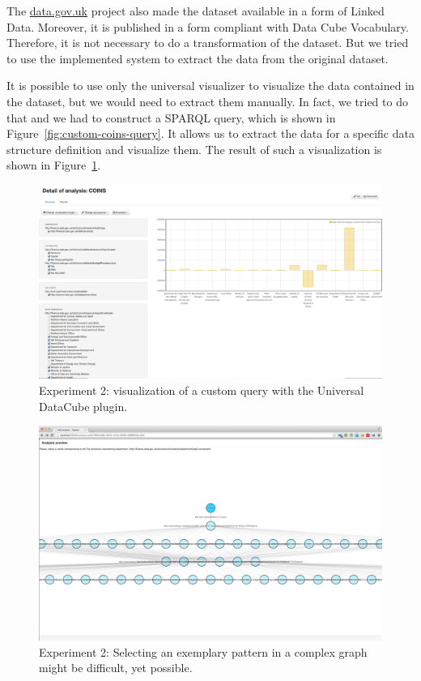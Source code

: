 The \url{data.gov.uk} project also made the dataset available in a form of Linked 
Data. Moreover, it is published in a form compliant with Data Cube Vocabulary.
Therefore, it is not necessary to do a transformation of the dataset. But we 
tried to use the implemented system to extract the data from the original 
dataset.

It is possible to use only the universal visualizer to visualize the data 
contained in the dataset, but we would need to extract them manually. In fact, 
we tried to do that and we had to construct a SPARQL query, which is shown in
Figure~\ref{fig:custom-coins-query}. It allows us to extract the data for a specific data structure 
definition and visualize them. The result of such a visualization is shown in 
Figure~\ref{fig:payola-exp-02}. 

\begin{figure}
  \centering
  \includegraphics[width=140mm]{img/payola-exp-02.png}
  \caption{Experiment 2: visualization of a custom query with the Universal DataCube plugin.}
  \label{fig:payola-exp-02}
\end{figure}

\begin{figure}
  \centering
  \includegraphics[width=140mm]{img/payola-exp-02-pattern.png}
  \caption{Experiment 2: Selecting an exemplary pattern in a complex graph might be difficult, yet possible.}
  \label{fig:payola-exp-02-pattern}
\end{figure}

